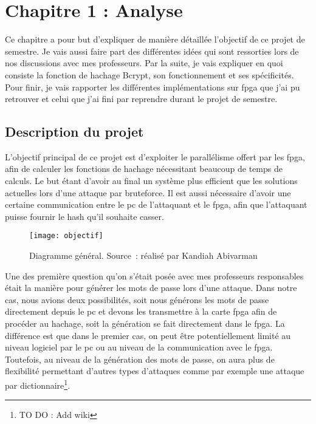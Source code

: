 \chapter{Chapitre 1 : Analyse}

Ce chapitre a pour but d'expliquer de manière détaillée l'objectif de ce projet de semestre. Je vais aussi faire part des différentes idées qui sont ressorties lors de nos discussions avec mes professeurs. Par la suite, je vais expliquer en quoi consiste la fonction de hachage Bcrypt, son fonctionnement et ses spécificités. Pour finir, je vais rapporter les différentes implémentations sur \gls{fpga} que j'ai pu retrouver et celui que j'ai fini par reprendre durant le projet de semestre. 

\section{Description du projet}

L'objectif principal de ce projet est d'exploiter le parallélisme offert par les \gls{fpga}, afin de calculer les fonctions de hachage nécessitant beaucoup de temps de calculs. Le but étant d'avoir au final un système plus efficient que les solutions actuelles lors d'une attaque par bruteforce. Il est aussi nécessaire d'avoir une certaine communication entre le \gls{pc} de l'attaquant et le \gls{fpga}, afin que l'attaquant puisse fournir le hash qu'il souhaite casser.

\begin{figure}[tbph!]
	\centering
	\texttt{[image: objectif]}
	\caption[Diagramme général]{Diagramme général. Source : réalisé par Kandiah Abivarman}
	\label{fig:objectif}
\end{figure}

Une des première question qu'on s'était posée avec mes professeurs responsables était la manière pour générer les mots de passe lors d'une attaque. 
Dans notre cas, nous avions deux possibilités, soit nous générons les mots de passe directement depuis le \gls{pc} et devons les transmettre à la carte \gls{fpga} afin de procéder au hachage, soit la génération se fait directement dans le \gls{fpga}. 
La différence est que dans le premier cas, on peut être potentiellement limité au niveau logiciel par le \gls{pc} ou au niveau de la communication avec le \gls{fpga}. 
Toutefois, au niveau de la génération des mots de passe, on aura plus de flexibilité permettant d'autres types d'attaques comme par exemple une attaque par dictionnaire\footnote{TO DO : Add wiki}.

